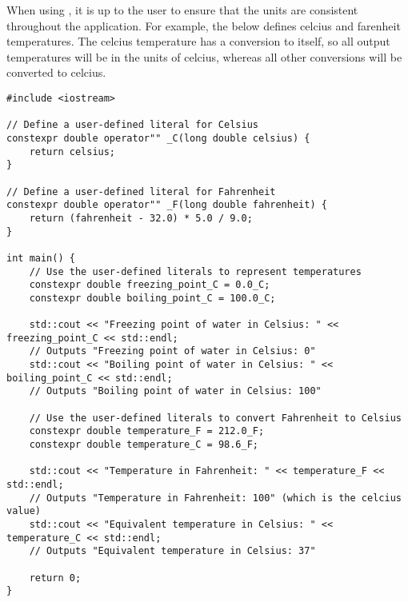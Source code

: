 When using  , it is up to the user to ensure that the units are consistent throughout the application. For example, the below defines celcius and farenheit temperatures. The celcius temperature has a conversion to itself, so all output temperatures will be in the units of celcius, whereas all other conversions will be converted to celcius.
\begin{lstlisting}
#include <iostream>

// Define a user-defined literal for Celsius
constexpr double operator"" _C(long double celsius) {
    return celsius;
}

// Define a user-defined literal for Fahrenheit
constexpr double operator"" _F(long double fahrenheit) {
    return (fahrenheit - 32.0) * 5.0 / 9.0;
}

int main() {
    // Use the user-defined literals to represent temperatures
    constexpr double freezing_point_C = 0.0_C;
    constexpr double boiling_point_C = 100.0_C;

    std::cout << "Freezing point of water in Celsius: " << freezing_point_C << std::endl;
	// Outputs "Freezing point of water in Celsius: 0"
    std::cout << "Boiling point of water in Celsius: " << boiling_point_C << std::endl;
	// Outputs "Boiling point of water in Celsius: 100"

    // Use the user-defined literals to convert Fahrenheit to Celsius
    constexpr double temperature_F = 212.0_F;
    constexpr double temperature_C = 98.6_F;

    std::cout << "Temperature in Fahrenheit: " << temperature_F << std::endl;
	// Outputs "Temperature in Fahrenheit: 100" (which is the celcius value)
    std::cout << "Equivalent temperature in Celsius: " << temperature_C << std::endl;
	// Outputs "Equivalent temperature in Celsius: 37"

    return 0;
}
\end{lstlisting}








\subsubsection{}

